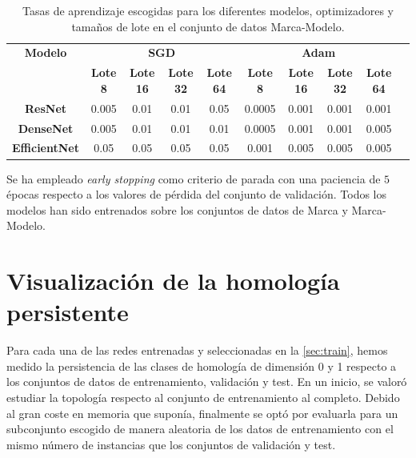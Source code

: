 \begin{table}[H]
	\centering
	\begin{adjustbox}
		{max width=\textwidth}
		\begin{tabular}{|c|c|c|c|c|c|c|c|c|c|}
			\hline
			\textbf{Modelo}       & \multicolumn{4}{c|}{\textbf{SGD}} & \multicolumn{4}{c|}{\textbf{Adam}} \\
			\cline{2-9}           & \textbf{Lote 8}                   & \textbf{Lote 16}                  & \textbf{Lote 32} & \textbf{Lote 64} & \textbf{Lote 8} & \textbf{Lote 16} & \textbf{Lote 32} & \textbf{Lote 64} \\
			\hline
			\textbf{ResNet}       & 0.005                             & 0.01                              & 0.01             & 0.05             & 0.0005          & 0.001            & 0.001            & 0.001            \\
			\hline
			\textbf{DenseNet}     & 0.005                             & 0.01                              & 0.01             & 0.01             & 0.0005          & 0.001            & 0.001            & 0.005            \\
			\hline
			\textbf{EfficientNet} & 0.05                              & 0.05                              & 0.05             & 0.05             & 0.001           & 0.005            & 0.005            & 0.005            \\
			\hline
		\end{tabular}
	\end{adjustbox}
	\caption{Tasas de aprendizaje escogidas para los diferentes modelos, optimizadores
		y tamaños de lote en el conjunto de datos Marca-Modelo.}
	\label{tab:bs-optim-marca-modelo}
\end{table}

Se ha empleado \textit{early stopping} como criterio de parada con una paciencia
de $5$ épocas respecto a los valores de pérdida del conjunto de validación.
Todos los modelos han sido entrenados sobre los conjuntos de datos de Marca y
Marca-Modelo.

\section{Visualización de la homología persistente}

Para cada una de las redes entrenadas y seleccionadas en la \autoref{sec:train},
hemos medido la persistencia de las clases de homología de dimensión 0 y 1
respecto a los conjuntos de datos de entrenamiento, validación y test. En un
inicio, se valoró estudiar la topología respecto al conjunto de entrenamiento al
completo. Debido al gran coste en memoria que suponía, finalmente se optó por evaluarla
para un subconjunto escogido de manera aleatoria de los datos de entrenamiento con
el mismo número de instancias que los conjuntos de validación y test.

